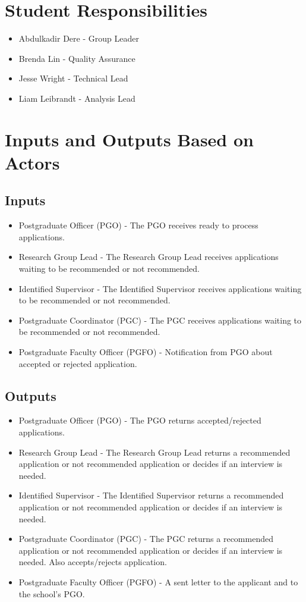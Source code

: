 \documentclass{article}
\begin{document}
\section*{Student Responsibilities}
\begin{itemize}
\item Abdulkadir Dere - Group Leader
\item Brenda Lin - Quality Assurance
\item Jesse Wright - Technical Lead
\item Liam Leibrandt - Analysis Lead
\end{itemize}

\section*{Inputs and Outputs Based on Actors}
\subsection*{Inputs}
\begin{itemize}
\item Postgraduate Officer (PGO) - The PGO receives ready to process applications.
\item Research Group Lead - The Research Group Lead receives applications waiting to be
recommended or not recommended.
\item Identified Supervisor - The Identified Supervisor receives applications waiting to be
recommended or not recommended.
\item Postgraduate Coordinator (PGC) - The PGC receives applications waiting to be
recommended or not recommended.
\item Postgraduate Faculty Officer (PGFO) - Notification from PGO about accepted or rejected
application.
\end{itemize}

\subsection*{Outputs}
\begin{itemize}
\item Postgraduate Officer (PGO) - The PGO returns accepted/rejected applications.
\item Research Group Lead - The Research Group Lead returns a recommended application or not
recommended application or decides if an interview is needed.
\item Identified Supervisor - The Identified Supervisor returns a recommended application or not recommended application or decides if an interview is needed.
\item Postgraduate Coordinator (PGC) - The PGC returns a recommended application or not
recommended application or decides if an interview is needed. Also accepts/rejects
application.
\item Postgraduate Faculty Officer (PGFO) - A sent letter to the applicant and to the school’s PGO.
\end{itemize}
\end{document}
